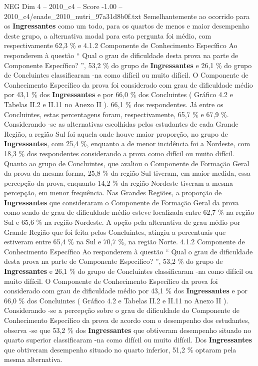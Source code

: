 \begin{textsample}{NEG Dim 4 – 2010\_c4 – Score -1.00 – 2010\_c4/enade\_2010\_nutri\_97a31d8b0f.txt}
Semelhantemente ao ocorrido para os \textbf{Ingressantes} como um todo, para os quartos de menos e maior desempenho deste grupo, a alternativa modal para esta pergunta foi médio, com respectivamente 62,3 \% e 4.1.2 Componente de Conhecimento Específico Ao responderem à questão “ Qual o grau de dificuldade desta prova na parte de Componente Específico? ”, 53,2 \% do grupo de \textbf{Ingressantes} e 26,1 \% do grupo de Concluintes classificaram -na como difícil ou muito difícil.
O Componente de Conhecimento Específico da prova foi considerado com grau de dificuldade médio por 43,1 \% dos \textbf{Ingressantes} e por 66,0 \% dos Concluintes ( Gráfico 4.2 e Tabelas II.2 e II.11 no Anexo II ). 66,1 \% dos respondentes.
Já entre os Concluintes, estas percentagens foram, respectivamente, 65,7 \% e 67,9 \%.
Considerando -se as alternativas escolhidas pelos estudantes de cada Grande Região, a região Sul foi aquela onde houve maior proporção, no grupo de \textbf{Ingressantes}, com 25,4 \%, enquanto a de menor incidência foi a Nordeste, com 18,3 \% dos respondentes considerando a prova como difícil ou muito difícil.
Quanto ao grupo de Concluintes, que avaliou o Componente de Formação Geral da prova da mesma forma, 25,8 \% da região Sul tiveram, em maior medida, essa percepção da prova, enquanto 14,2 \% da região Nordeste tiveram a mesma percepção, em menor frequência.
Nas Grandes Regiões, a proporção de \textbf{Ingressantes} que consideraram o Componente de Formação Geral da prova como sendo de grau de dificuldade médio esteve localizada entre 62,7 \% na região Sul e 65,6 \% na região Nordeste.
A opção pela alternativa de grau médio por Grande Região que foi feita pelos Concluintes, atingiu a percentuais que estiveram entre 65,4 \% na Sul e 70,7 \%, na região Norte. 4.1.2 Componente de Conhecimento Específico Ao responderem à questão “ Qual o grau de dificuldade desta prova na parte de Componente Específico? ”, 53,2 \% do grupo de \textbf{Ingressantes} e 26,1 \% do grupo de Concluintes classificaram -na como difícil ou muito difícil.
O Componente de Conhecimento Específico da prova foi considerado com grau de dificuldade médio por 43,1 \% dos \textbf{Ingressantes} e por 66,0 \% dos Concluintes ( Gráfico 4.2 e Tabelas II.2 e II.11 no Anexo II ).
Considerando -se a percepção sobre o grau de dificuldade do Componente de Conhecimento Específico da prova de acordo com o desempenho dos estudantes, observa -se que 53,2 \% dos \textbf{Ingressantes} que obtiveram desempenho situado no quarto superior classificaram -na como difícil ou muito difícil.
Dos \textbf{Ingressantes} que obtiveram desempenho situado no quarto inferior, 51,2 \% optaram pela mesma alternativa.

\end{textsample}
